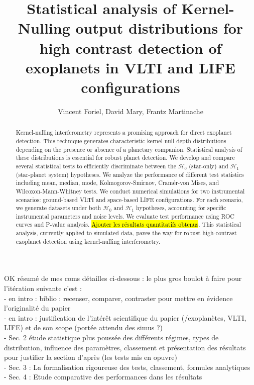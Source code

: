 \documentclass{article}
\title{Statistical analysis of Kernel-Nulling output distributions for high contrast detection of exoplanets in VLTI and LIFE configurations}
\author{Vincent Foriel,
        David Mary,
        Frantz Martinache
       }
\newcommand{\dm}[1]{{\color{mulberry} #1}}
\begin{document}
\maketitle

\begin{abstract}
Kernel-nulling interferometry represents a promising approach for direct exoplanet detection. This technique generates characteristic kernel-null depth distributions depending on the presence or absence of a planetary companion. Statistical analysis of these distributions is essential for robust planet detection. We develop and compare several statistical tests to efficiently discriminate between the ${\mathcal{H}}_0$ (star-only) and ${\mathcal{H}}_1$ (star-planet system) hypotheses. We analyze the performance of different test statistics including mean, median, mode, Kolmogorov-Smirnov, Cramér-von Mises, and Wilcoxon-Mann-Whitney tests. We conduct numerical simulations for two instrumental scenarios: ground-based VLTI and space-based LIFE configurations. For each scenario, we generate datasets under both ${\mathcal{H}}_0$ and ${\mathcal{H}}_1$ hypotheses, accounting for specific instrumental parameters and noise levels. We evaluate test performance using ROC curves and P-value analysis. \hl{Ajouter les résultats quantitatifs obtenus}. This statistical analysis, currently applied to simulated data, paves the way for robust high-contrast exoplanet detection using kernel-nulling interferometry.
\end{abstract}


\dm{OK résumé de mes coms détailles ci-dessous : le plus gros boulot à faire pour l'itération suivante c'est : \\
- en intro : biblio : recenser, comparer, contraster pour mettre en évidence l'originalité du papier\\
- en intro : justification de l'intérêt scientifique du papier (/exoplanètes, VLTI, LIFE) et de son scope (portée attendu des simus ?) \\
- Sec. 2 étude statistique plus poussée des différents régimes, types de distribution, influence des paramètres, classement et présentation des résultats pour justifier la section d'après (les tests mis en opuvre)\\
- Sec. 3 : La formalisation rigoureuse des tests, classement, formules analytiques \\
- Sec. 4 : Etude comparative des performances dans les résultats }
\end{document}
